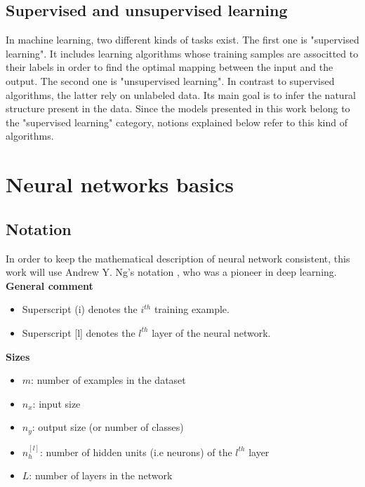 \subsection{Supervised and unsupervised learning}
In machine learning, two different kinds of tasks exist. The first one is "supervised learning". It includes learning algorithms whose training samples are associtted to their labels in order to find the optimal mapping between the input and the output. The second one is "unsupervised learning". In contrast to supervised algorithms, the latter rely on unlabeled data. Its main goal is to infer the natural structure  present in the data. Since the models presented in this work belong to the "supervised learning" category, notions explained below refer to this kind of algorithms.


\section{Neural networks basics}

\subsection{Notation}
In order to keep the mathematical description of neural network consistent, this work will use Andrew Y. Ng's notation \cite{16}, who was a pioneer in deep learning.\\

\noindent \textbf{General comment}
\begin{itemize}
\item Superscript (i) denotes the $i^{th}$ training example.
\item Superscript [l] denotes the $l^{th}$ layer of the neural network.
\end{itemize}

\noindent \textbf{Sizes}
\begin{itemize}
\item $m$: number of examples in the dataset
\item $n_{x}$: input size
\item $n_{y}$: output size (or number of classes)
\item $n_{h}^{[l]}$: number of hidden units (i.e neurons) of the $l^{th}$ layer
\item $L$: number of layers in the network
\end{itemize}

